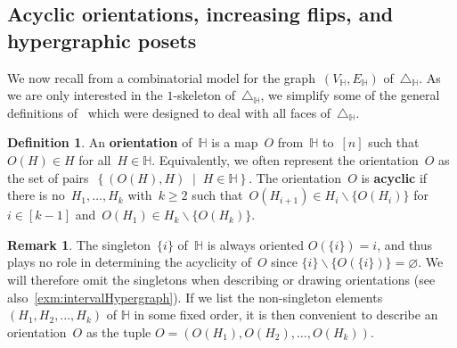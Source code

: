 \documentclass[reqno]{amsart}
\theoremstyle{definition}
\newtheorem{definition}[theorem]{Definition}
\newtheorem{remark}[theorem]{Remark}
\newcommand{\set}[2]{\left\{ #1 \;\middle|\; #2 \right\}} %
\newcommand{\ssm}{\smallsetminus} %
\newcommand{\simplex}{\triangle} %
\newcommand{\defn}[1]{\textbf{\textsf{\color{PineGreen} #1}}} %
\newcommand{\HH}{\mathbb H}  %
\begin{document}

\subsection{Acyclic orientations, increasing flips, and hypergraphic posets} 
\label{subsec:P_H}

We now recall from \cite[Thm.~2.18]{BenedettiBergeronMachacek} a combinatorial model for the graph~$(V_\HH, E_\HH)$ of~$\simplex_\HH$.
As we are only interested in the $1$-skeleton of~$\simplex_\HH$, we simplify some of the general definitions of~\cite{BenedettiBergeronMachacek} which were designed to deal with all faces of~$\simplex_\HH$.

\begin{definition}
\label{def:acyclicOrientation}
An \defn{orientation} of~$\HH$ is a map~$O$ from~$\HH$ to~$[n]$ such that~$O(H) \in H$ for all~${H \in \HH}$.
Equivalently, we often represent the orientation~$O$ as the set of pairs~$\set{(O(H),H)}{H \in \HH}$.
The orientation~$O$ is \defn{acyclic} if there is no~$H_1, \dots, H_k$ with~$k \ge 2$ such that~$O(H_{i+1}) \in H_i \ssm \{O(H_i)\}$ for~$i \in [k-1]$ and~$O(H_1) \in H_k \ssm \{O(H_k)\}$.
\end{definition}

\begin{remark}
The singleton~$\{i\}$ of~$\HH$ is always oriented $O(\{i\})=i$, and thus plays no role in determining  the acyclicity of~$O$ since $\{i\} \ssm \{O(\{i\})\} = \varnothing$.
We will therefore omit the singletons when describing or drawing orientations (see also~\cref{exm:intervalHypergraph}).
If we list the non-singleton elements $(H_1,H_2,...,H_k)$ of $\HH$ in some fixed order, it is then convenient to describe an orientation~$O$ as the tuple $O=(O(H_1),O(H_2),\ldots,O(H_k))$. 
\end{remark}
\end{document}
